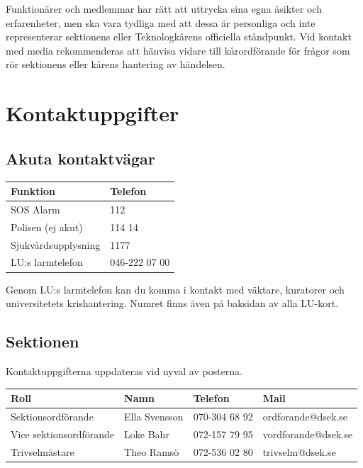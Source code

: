 \documentclass[pdfbookmarks,a4paper,11pt]{article}
\begin{document}
Funktionärer och medlemmar har rätt att uttrycka sina egna åsikter och erfarenheter, men ska vara tydliga med att dessa är personliga och inte representerar sektionens eller Teknologkårens officiella ståndpunkt. Vid kontakt med media rekommenderas att hänvisa vidare till kårordförande för frågor som rör sektionens eller kårens hantering av händelsen.

\section{Kontaktuppgifter}

\subsection{Akuta kontaktvägar}

\begin{table}[h]
\centering
\renewcommand{\arraystretch}{1.3}

\begin{tabularx}{\textwidth}{X l}
\toprule
\textbf{Funktion} & \textbf{Telefon} \\
\midrule
SOS Alarm & 112 \\
Polisen (ej akut) & 114 14 \\
Sjukvårdsupplysning & 1177 \\
LU:s larmtelefon & 046-222 07 00 \\
\bottomrule
\end{tabularx}
\end{table}

Genom LU:s larmtelefon kan du komma i kontakt med väktare, kuratorer och universitetets krishantering. Numret finns även på baksidan av alla LU-kort.

\subsection{Sektionen}

Kontaktuppgifterna uppdateras vid nyval av posterna.

\begin{table}[h]
\centering
\renewcommand{\arraystretch}{1.3}

\begin{tabularx}{\textwidth}{X l l X}
\toprule
\textbf{Roll} & \textbf{Namn} & \textbf{Telefon} & \textbf{Mail} \\
\midrule
Sektionsordförande & Ella Svensson & 070-304 68 92 & ordforande@dsek.se \\
Vice sektionsordförande & Loke Bahr & 072-157 79 95 & vordforande@dsek.se \\
Trivselmästare & Theo Ramsö & 072-536 02 80 & trivselm@dsek.se \\
\bottomrule
\end{tabularx}
\end{table}
\end{document}
